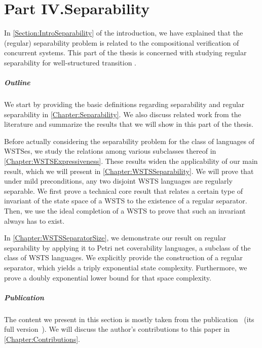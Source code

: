 \documentclass[../../diss.tex]{subfiles}
\begin{document}
\chapter*{Part IV.\newline Separability}

In \cref{Section:IntroSeparability} of the introduction, we have explained that the (regular) separability problem is related to the compositional verification of concurrent systems.
This part of the thesis is concerned with studying regular separability for well-structured transition .

\paragraph{Outline}

We start by providing the basic definitions regarding separability and regular separability in \cref{Chapter:Separability}.
We also discuss related work from the literature and summarize the results that we will show in this part of the thesis.

Before actually considering the separability problem for the class of languages of WSTSes, we study the relations among various subclasses thereof in \cref{Chapter:WSTSExpressiveness}.
These results widen the applicability of our main result, which we will present in \cref{Chapter:WSTSSeparability}.
We will prove that under mild preconditions, any two disjoint WSTS languages are regularly separable.
We first prove a technical core result that relates a certain type of invariant of the state space of a WSTS to the existence of a regular separator.
Then, we use the ideal completion of a WSTS to prove that such an invariant always has to exist.

In \cref{Chapter:WSTSSeparatorSize}, we demonstrate our result on regular separability by applying it to Petri net coverability languages, a subclass of the class of WSTS languages.
We explicitly provide the construction of a regular separator, which yields a triply exponential state complexity.
Furthermore, we prove a doubly exponential lower bound for that space complexity.

\paragraph{Publication}

The content we present in this section is mostly taken from the publication~\cite{CzerwinskiLMMKS18} (\resp its full version~\cite{CzerwinskiLMMKS18a}).
We will discuss the author's contributions to this paper in \cref{Chapter:Contributions}.
\end{document}

